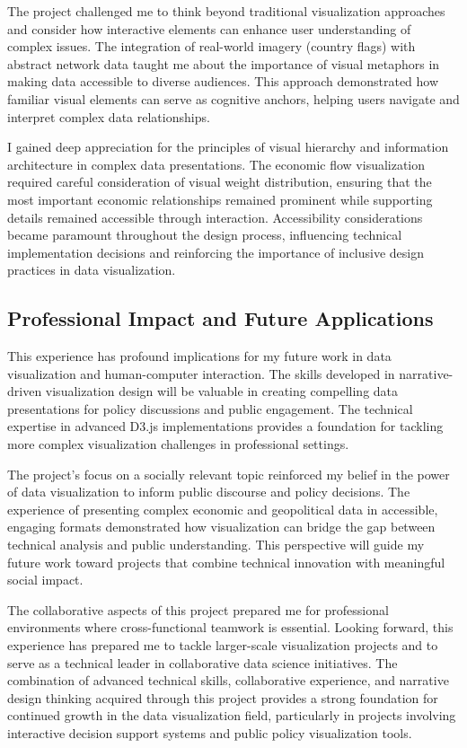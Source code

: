 \documentclass[conference]{IEEEtran}
\begin{document}
The project challenged me to think beyond traditional visualization approaches and consider how interactive elements can enhance user understanding of complex issues. The integration of real-world imagery (country flags) with abstract network data taught me about the importance of visual metaphors in making data accessible to diverse audiences. This approach demonstrated how familiar visual elements can serve as cognitive anchors, helping users navigate and interpret complex data relationships.

I gained deep appreciation for the principles of visual hierarchy and information architecture in complex data presentations. The economic flow visualization required careful consideration of visual weight distribution, ensuring that the most important economic relationships remained prominent while supporting details remained accessible through interaction. Accessibility considerations became paramount throughout the design process, influencing technical implementation decisions and reinforcing the importance of inclusive design practices in data visualization.

\subsection{Professional Impact and Future Applications}

This experience has profound implications for my future work in data visualization and human-computer interaction. The skills developed in narrative-driven visualization design will be valuable in creating compelling data presentations for policy discussions and public engagement. The technical expertise in advanced D3.js implementations provides a foundation for tackling more complex visualization challenges in professional settings.

The project's focus on a socially relevant topic reinforced my belief in the power of data visualization to inform public discourse and policy decisions. The experience of presenting complex economic and geopolitical data in accessible, engaging formats demonstrated how visualization can bridge the gap between technical analysis and public understanding. This perspective will guide my future work toward projects that combine technical innovation with meaningful social impact.

The collaborative aspects of this project prepared me for professional environments where cross-functional teamwork is essential. Looking forward, this experience has prepared me to tackle larger-scale visualization projects and to serve as a technical leader in collaborative data science initiatives. The combination of advanced technical skills, collaborative experience, and narrative design thinking acquired through this project provides a strong foundation for continued growth in the data visualization field, particularly in projects involving interactive decision support systems and public policy visualization tools.
\end{document}
